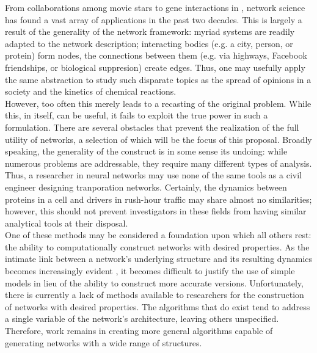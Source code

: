 \documentclass[11pt]{article}
\begin{document}
\indent From collaborations among movie stars \cite{Barabasi1999} to gene interactions in  \cite{Dreze2009}, network science has found a vast array of applications in the past two decades. This is largely a result of the generality of the network framework: myriad systems are readily adapted to the network description; interacting bodies (e.g. a city, person, or protein) form nodes, the connections between them (e.g. via highways, Facebook friendships, or biological suppresion) create edges. Thus, one may usefully apply the same abstraction to study such disparate topics as the spread of opinions in a society and the kinetics of chemical reactions. \vspace{1mm}\\
\indent However, too often this merely leads to a recasting of the original problem. While this, in itself, can be useful, it fails to exploit the true power in such a formulation. There are several obstacles that prevent the realization of the full utility of networks, a selection of which will be the focus of this proposal. Broadly speaking, the generality of the construct is in some sense its undoing: while numerous problems are addressable, they require many different types of analysis. Thus, a researcher in neural networks may use none of the same tools as a civil engineer designing tranporation networks. Certainly, the dynamics between proteins in a cell and drivers in rush-hour traffic may share almost no similarities; however, this should not prevent investigators in these fields from having similar analytical tools at their disposal.\vspace{1mm}\\ %
\indent One of these methods may be considered a foundation upon which all others rest: the ability to computationally construct networks with desired properties. As the intimate link between a network's underlying structure and its resulting dynamics becomes increasingly evident \cite{Barabasi1999} \cite{Barzel2013}, it becomes difficult to justify the use of simple models in lieu of the ability to construct more accurate versions. Unfortunately, there is currently a lack of methods available to researchers for the construction of networks with desired properties. The algorithms that do exist tend to address a single variable of the network's architecture, leaving others unspecified. Therefore, work remains in creating more general algorithms capable of generating networks with a wide range of structures.\vspace{1mm}\\
\end{document}
